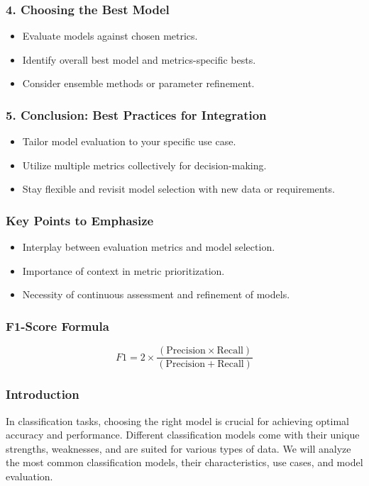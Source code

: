 \documentclass[aspectratio=169]{beamer}
\begin{document}
\begin{frame}[fragile]
    \frametitle{4. Choosing the Best Model}
    \begin{itemize}
        \item Evaluate models against chosen metrics.
        \item Identify overall best model and metrics-specific bests.
        \item Consider ensemble methods or parameter refinement.
    \end{itemize}
\end{frame}

\begin{frame}[fragile]
    \frametitle{5. Conclusion: Best Practices for Integration}
    \begin{itemize}
        \item Tailor model evaluation to your specific use case.
        \item Utilize multiple metrics collectively for decision-making.
        \item Stay flexible and revisit model selection with new data or requirements.
    \end{itemize}
\end{frame}

\begin{frame}[fragile]
    \frametitle{Key Points to Emphasize}
    \begin{itemize}
        \item Interplay between evaluation metrics and model selection.
        \item Importance of context in metric prioritization.
        \item Necessity of continuous assessment and refinement of models.
    \end{itemize}
\end{frame}

\begin{frame}[fragile]
    \frametitle{F1-Score Formula}
    \begin{equation}
        F1 = 2 \times \frac{(\text{Precision} \times \text{Recall})}{(\text{Precision} + \text{Recall})}
    \end{equation}
\end{frame}

\begin{frame}[fragile]
    \frametitle{Introduction}
    In classification tasks, choosing the right model is crucial for achieving optimal accuracy and performance. 
    Different classification models come with their unique strengths, weaknesses, and are suited for various types of data. 
    We will analyze the most common classification models, their characteristics, use cases, and model evaluation.
\end{frame}
\end{document}
